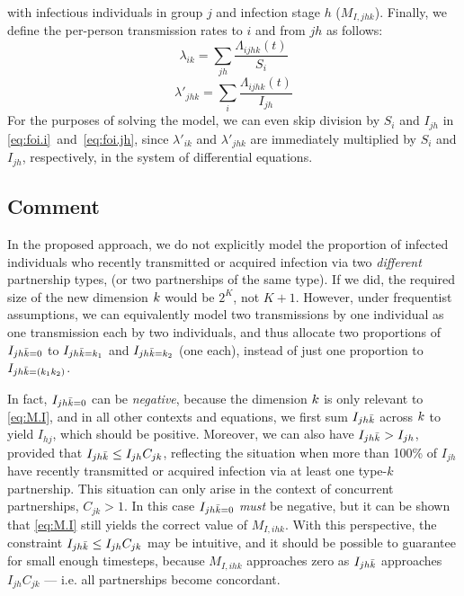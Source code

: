 with infectious individuals in group $j$ and infection stage $h$ ($M_{I,jhk}$).
Finally, we define the per-person transmission rates
to $i$ and from $jh$ as follows:
\begin{equation}\label{eq:foi.i}
  \lambda_{ik} = \sum_{jh} \frac{\Lambda_{ijhk}(t)}{S_{i}}
\end{equation}
\begin{equation}\label{eq:foi.jh}
  \lambda'_{jhk} = \sum_{i} \frac{\Lambda_{ijhk}(t)}{I_{jh}}
\end{equation}
For the purposes of solving the model,
we can even skip division by $S_i$ and $I_{jh}$ in \eqref{eq:foi.i}~and~\eqref{eq:foi.jh},
since $\lambda'_{ik}$ and $\lambda'_{jhk}$ are immediately multiplied by $S_i$ and $I_{jh}$,
respectively, in the system of differential equations.
\subsection{Comment}
In the proposed approach, we do not explicitly model the proportion of infected individuals
who recently transmitted or acquired infection via two \emph{different} partnership types,
(or two partnerships of the same type).
If we did, the required size of the new dimension $\k$ would be $2^{K}$, not $K+1$.
However, under frequentist assumptions, we can equivalently model
two transmissions by one individual as one transmission each by two individuals,
and thus allocate two proportions of $I_{jh\k=0}$ to $I_{jh\k=k_1}$ and $I_{jh\k=k_2}$ (one each),
instead of just one proportion to $I_{jh\k={(k_1k_2)}}$.
\par
In fact, $I_{jh\k=0}$ can be \emph{negative},
because the dimension $\k$ is only relevant to \eqref{eq:M.I},
and in all other contexts and equations,
we first sum $I_{jh\k}$ across $\k$ to yield $I_{hj}$, which should be positive.
Moreover, we can also have $I_{jh\k} > I_{jh}$, provided that $I_{jh\k} \le I_{jh} C_{jk}$,
reflecting the situation when more than 100\% of $I_{jh}$
have recently transmitted or acquired infection via at least one type-$k$ partnership.
This situation can only arise in the context of concurrent partnerships, $C_{jk} > 1$.
In this case $I_{jh\k=0}$ \emph{must} be negative,
but it can be shown that \eqref{eq:M.I} still yields the correct value of $M_{I,ihk}$.
With this perspective, the constraint $I_{jh\k} \le I_{jh} C_{jk}$ may be intuitive,
and it should be possible to guarantee for small enough timesteps,
because $M_{I,ihk}$ approaches zero as $I_{jh\k}$ approaches $I_{jh} C_{jk}$
--- i.e. all partnerships become concordant.
